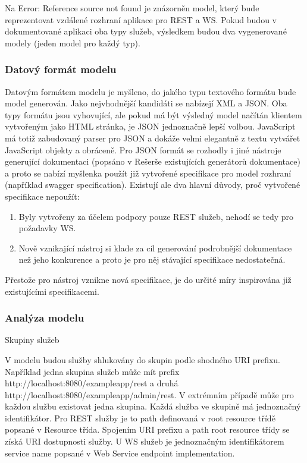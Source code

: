 \documentclass[11pt,twoside,a4paper]{book}
\begin{document}
Na Error: Reference source not found je znázorněn model, který bude reprezentovat vzdálené
rozhraní aplikace pro REST a WS. Pokud budou v dokumentované aplikaci oba typy služeb,
výsledkem budou dva vygenerované modely (jeden model pro každý typ).

\subsubsection{Datový formát modelu}

Datovým formátem modelu je myšleno, do jakého typu textového formátu bude model
generován. Jako nejvhodnější kandidáti se nabízejí XML a JSON. Oba typy formátu jsou
vyhovující, ale pokud má být výsledný model načítán klientem vytvořeným jako HTML
stránka, je JSON jednoznačně lepší volbou. JavaScript má totiž zabudovaný parser pro JSON
a dokáže velmi elegantně z textu vytvářet JavaScript objekty a obráceně. Pro JSON formát se
rozhodly i jiné nástroje generující dokumentaci (popsáno v Rešerše existujících generátorů
dokumentace) a proto se nabízí myšlenka použít již vytvořené specifikace pro model rozhraní
(například swagger specification). Existují ale dva hlavní důvody, proč vytvořené specifikace
nepoužít:

\begin{enumerate}
  \item Byly vytvořeny za účelem podpory pouze REST služeb, nehodí se tedy pro požadavky
WS.
  \item Nově vznikající nástroj si klade za cíl generování podrobnější dokumentace než jeho
konkurence a proto je pro něj stávající specifikace nedostatečná.
\end{enumerate}

Přestože pro nástroj vznikne nová specifikace, je do určité míry inspirována již existujícími
specifikacemi.

\subsubsection{Analýza modelu}

Skupiny služeb

V modelu budou služby shlukovány do skupin podle shodného URI prefixu. Například jedna
skupina služeb může mít prefix http://localhost:8080/exampleapp/rest a
druhá http://localhost:8080/exampleapp/admin/rest. V extrémním případě
může pro každou službu existovat jedna skupina. Každá služba ve skupině má jednoznačný
identifikátor. Pro REST služby je to path definovaná v root resource třídě popsané v Resource
třída. Spojením URI prefixu a path root resource třídy se získá URI dostupnosti služby. U WS
služeb je jednoznačným identifikátorem service name popsané v Web Service endpoint
implementation.
\end{document}
